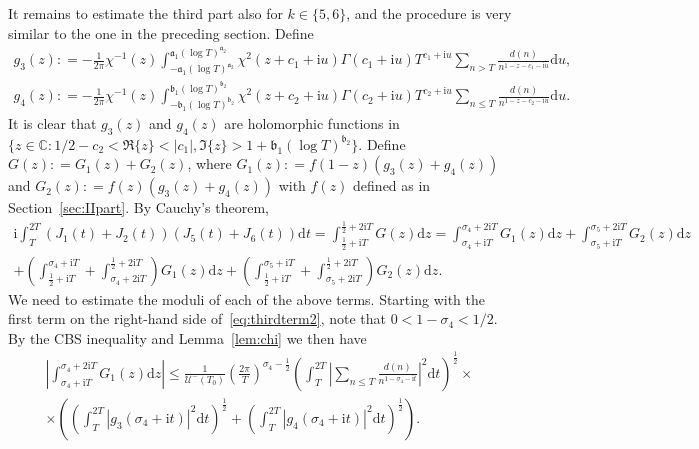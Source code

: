 \documentclass[a4paper,reqno]{amsart}
\theoremstyle{definition}
\newcommand{\C}{\mathbb{C}}
\newcommand{\de}[0]{\mathrel{\mathop:}=}
\newcommand{\ie}[0]{\mathrm{i}}
\newcommand{\dif}[1]{\mathrm{d}#1}
\begin{document}
It remains to estimate the third part also for $k\in\{5,6\}$, and the procedure is very similar to the one in the preceding section. Define
\begin{gather*}
g_3(z)\de -\frac{1}{2\pi}\chi^{-1}(z)\int_{-\mathfrak{a}_1(\log{T})^{\mathfrak{a}_2}}^{\mathfrak{a}_1(\log{T})^{\mathfrak{a}_2}}\chi^{2}(z+c_1+\ie u)\Gamma(c_1+\ie u)T^{c_1+\ie u}\sum_{n>T}\frac{d(n)}{n^{1-z-c_1-\ie u}}\dif{u}, \\
g_4(z)\de -\frac{1}{2\pi}\chi^{-1}(z)\int_{-\mathfrak{b}_1(\log{T})^{\mathfrak{b}_2}}^{\mathfrak{b}_1(\log{T})^{\mathfrak{b}_2}}\chi^{2}(z+c_2+\ie u)\Gamma(c_2+\ie u)T^{c_2+\ie u}\sum_{n\leq T}\frac{d(n)}{n^{1-z-c_2-\ie u}}\dif{u}.
\end{gather*}
It is clear that $g_3(z)$ and $g_4(z)$ are holomorphic functions in $\{z\in\C\colon 1/2-c_2<\Re\{z\}<|c_1|,\Im\{z\}>1+\mathfrak{b_1}(\log{T})^{\mathfrak{b}_2}\}$. Define $G(z)\de G_1(z)+G_2(z)$, where $G_1(z)\de f(1-z)\left(g_3(z)+g_4(z)\right)$ and $G_2(z)\de f(z)\left(g_3(z)+g_4(z)\right)$ with $f(z)$ defined as in Section~\ref{sec:IIpart}. By Cauchy's theorem,
\begin{multline}
\label{eq:thirdterm2}
\ie\int_{T}^{2T}\left(J_1(t)+J_2(t)\right)\left(J_5(t)+J_6(t)\right)\dif{t} = \int_{\frac{1}{2}+\ie T}^{\frac{1}{2}+2\ie T}G(z)\dif{z} = \int_{\sigma_4+\ie T}^{\sigma_4+2\ie T}G_1(z)\dif{z} + \int_{\sigma_5+\ie T}^{\sigma_5+2\ie T}G_2(z)\dif{z} \\
+ \left(\int_{\frac{1}{2}+\ie T}^{\sigma_4+\ie T}+\int_{\sigma_4+2\ie T}^{\frac{1}{2}+2\ie T}\right)G_1(z)\dif{z} + \left(\int_{\frac{1}{2}+\ie T}^{\sigma_5+\ie T}+\int_{\sigma_5+2\ie T}^{\frac{1}{2}+2\ie T}\right)G_{2}(z)\dif{z}.
\end{multline}
We need to estimate the moduli of each of the above terms. Starting with the first term on the right-hand side of~\eqref{eq:thirdterm2}, note that $0<1-\sigma_4<1/2$. By the CBS inequality and Lemma~\ref{lem:chi} we then have
\begin{multline}
\label{eq:G1First}
\left|\int_{\sigma_4+\ie T}^{\sigma_4+2\ie T}G_1(z)\dif{z}\right| \leq \frac{1}{\mathcal{U}^{-}(T_0)}\left(\frac{2\pi}{T}\right)^{\sigma_4-\frac{1}{2}}\left(\int_{T}^{2T}\left|\sum_{n\leq T}\frac{d(n)}{n^{1-\sigma_4-\ie t}}\right|^{2}\dif{t}\right)^{\frac{1}{2}} \times \\
\times\left(\left(\int_{T}^{2T}\left|g_3(\sigma_4+\ie t)\right|^{2}\dif{t}\right)^{\frac{1}{2}}+\left(\int_{T}^{2T}\left|g_4(\sigma_4+\ie t)\right|^{2}\dif{t}\right)^{\frac{1}{2}}\right).
\end{multline}
\end{document}
